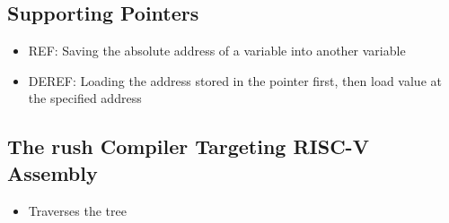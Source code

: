\subsection{Supporting Pointers}

\begin{itemize}
	\item REF: Saving the absolute address of a variable into another variable
	\item DEREF: Loading the address stored in the pointer first, then load value at the specified address
\end{itemize}

\subsection{The rush Compiler Targeting RISC-V Assembly}

\begin{itemize}
	\item Traverses the tree
\end{itemize}
